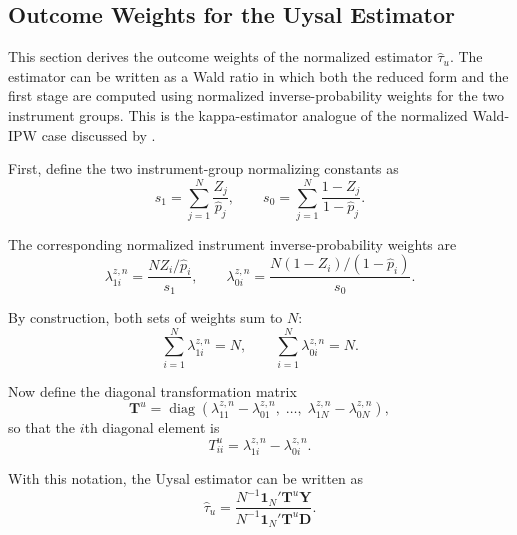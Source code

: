 \documentclass[12pt, a4paper, oneside]{article}
\theoremstyle{plain}
\theoremstyle{definition}
\begin{document}
 
\subsection{Outcome Weights for the Uysal Estimator}
\label{subsec:omega_u}

This section derives the outcome weights of the normalized estimator $\hat\tau_u$.
The estimator can be written as a Wald ratio in which both the reduced form and the
first stage are computed using normalized inverse-probability weights for the two
instrument groups. This is the kappa-estimator analogue of the normalized Wald-IPW
case discussed by \citet{knaus2024treatment}.

First, define the two instrument-group normalizing constants as
\begin{equation}
  s_1 = \sum_{j=1}^{N} \frac{Z_j}{\hat{p}_j},
  \qquad
  s_0 = \sum_{j=1}^{N} \frac{1-Z_j}{1-\hat{p}_j}.
  \label{eq:u_s1_s0}
\end{equation}

The corresponding normalized instrument inverse-probability weights are
\begin{equation}
  \lambda_{1i}^{z,n} = \frac{N Z_i/\hat{p}_i}{s_1},
  \qquad
  \lambda_{0i}^{z,n} = \frac{N(1-Z_i)/(1-\hat{p}_i)}{s_0}.
  \label{eq:u_norm_lambda}
\end{equation}

By construction, both sets of weights sum to $N$:
\begin{equation}
  \sum_{i=1}^{N} \lambda_{1i}^{z,n} = N,
  \qquad
  \sum_{i=1}^{N} \lambda_{0i}^{z,n} = N.
  \label{eq:u_norm_lambda_sums}
\end{equation}

Now define the diagonal transformation matrix
\begin{equation}
  \mathbf{T}^u = \operatorname{diag}\!\left(
    \lambda_{11}^{z,n} - \lambda_{01}^{z,n},\;
    \ldots,\;
    \lambda_{1N}^{z,n} - \lambda_{0N}^{z,n}
  \right),
  \label{eq:u_T_matrix}
\end{equation}
so that the $i$th diagonal element is
\begin{equation}
  T^u_{ii} = \lambda_{1i}^{z,n} - \lambda_{0i}^{z,n}.
  \label{eq:u_T_diag}
\end{equation}

With this notation, the Uysal estimator can be written as
\begin{equation}
  \hat\tau_u
  = \frac{N^{-1}\mathbf{1}_N'\mathbf{T}^u\mathbf{Y}}
         {N^{-1}\mathbf{1}_N'\mathbf{T}^u\mathbf{D}}.
  \label{eq:u_wald_matrix}
\end{equation}
\end{document}
